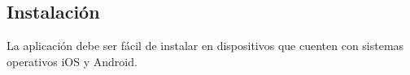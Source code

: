 \subsection{Instalaci\'on}
La aplicaci\'on debe ser f\'acil de instalar en dispositivos que cuenten con sistemas operativos iOS y Android.